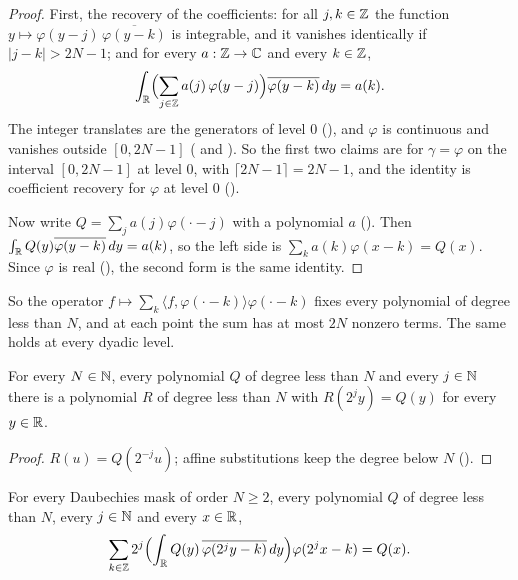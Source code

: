 \begin{proof}
\leanok
{}
First, the recovery of the coefficients: for all $j, k \in \mathbb{Z}$ the function
$y \mapsto \varphi(y - j) \, \overline{\varphi(y - k)}$ is integrable, and it vanishes
identically if $|j - k| > 2N - 1$; and for every $a : \mathbb{Z} \to \mathbb{C}$ and every $k \in \mathbb{Z}$,
\[
  \int_{\mathbb{R}} \Bigl(\sum_{j \in \mathbb{Z}} a(j) \, \varphi(y - j)\Bigr) \overline{\varphi(y - k)} \, dy
  = a(k) .
\]
The integer translates are the generators of level $0$ (), and
$\varphi$ is continuous and vanishes outside $[0, 2N - 1]$ (
and ). So the first two claims are
 for $\gamma = \varphi$ on the interval $[0, 2N - 1]$ at
level $0$, with $\lceil 2N - 1 \rceil = 2N - 1$, and the identity is coefficient recovery for
$\varphi$ at level $0$ ().

Now write $Q = \sum_j a(j) \varphi(\cdot - j)$ with a polynomial $a$
(). Then
$\int_{\mathbb{R}} Q(y) \overline{\varphi(y - k)} \, dy = a(k)$, so the left side is
$\sum_k a(k) \varphi(x - k) = Q(x)$. Since $\varphi$ is real (),
the second form is the same identity.
\end{proof}

So the operator $f \mapsto \sum_k \langle f, \varphi(\cdot - k) \rangle \varphi(\cdot - k)$
fixes every polynomial of degree less than $N$, and at each point the sum has at most $2N$
nonzero terms. The same holds at every dyadic level.

\begin{lemma}
\label{lem:daub-polynomial-dilation}
\leanok
For every $N \in \mathbb{N}$, every polynomial $Q$ of degree less than $N$ and every $j \in \mathbb{N}$ there is
a polynomial $R$ of degree less than $N$ with $R(2^j y) = Q(y)$ for every $y \in \mathbb{R}$.
\end{lemma}

\begin{proof}
\leanok
{}
$R(u) = Q(2^{-j} u)$; affine substitutions keep the degree below $N$ ().
\end{proof}

\begin{corollary}
\label{cor:daub-poly-reproduction-dyadic}
\leanok
{}
For every Daubechies mask of order $N \geq 2$, every polynomial $Q$ of degree less than $N$,
every $j \in \mathbb{N}$ and every $x \in \mathbb{R}$,
\[
  \sum_{k \in \mathbb{Z}} 2^j \Bigl(\int_{\mathbb{R}} Q(y) \, \overline{\varphi(2^j y - k)} \, dy\Bigr)
  \varphi(2^j x - k) = Q(x) .
\]
\end{corollary}

